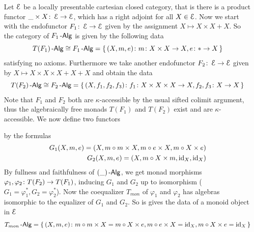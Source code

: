 \documentclass[a4paper,11pt,oneside,openany]{scrbook}
\begin{document}
\begin{exmp}
	Let $\operatorname{\mathcal{E}}$ be a locally presentable cartesian closed category, that is there is a product functor $\_ \times X \colon \operatorname{\mathcal{E}} \to \operatorname{\mathcal{E}}$, which has a right adjoint for
	all $X \in \operatorname{\mathcal{E}}$. Now we start with the endofunctor $F_{1} \colon \operatorname{\mathcal{E}} \to \operatorname{\mathcal{E}}$ given by the assignment $X \mapsto X \times X + X$. So the category of
	$F_{1}\operatorname{-\mathsf{Alg}}$ is given by the following data
	\begin{equation*}
		T(F_{1})\operatorname{-\mathsf{Alg}} \cong F_{1}\operatorname{-\mathsf{Alg}} = \left\lbrace\,(X,m,e)\colon m\colon X \times X \to X,e \colon \ast \to X  \,\right\rbrace
	\end{equation*}
	satisfying no axioms. Furthermore we take another endofunctor $F_{2} \colon \operatorname{\mathcal{E}} \to \operatorname{\mathcal{E}}$ given by $X \mapsto X \times X \times X + X + X$ and obtain the data
	\begin{equation*}
		T(F_{2})\operatorname{-\mathsf{Alg}} \cong F_{2}\operatorname{-\mathsf{Alg}} = \left\lbrace\,(X,f_{1},f_{2},f_{3})\colon f_{1}\colon X \times X \times X \to X, f_{2},f_{3} \colon X \to X \,\right\rbrace
	\end{equation*}
	Note that $F_{1}$ and $F_{2}$ both are $\kappa$-accessible by the usual sifted colimit argument, thus the algebraically free monads $T(F_{1})$ and
	$T(F_{2})$ exist and are $\kappa$-accessible. We now define two functors
	\begin{center}
	\end{center}
	by the formulas
	\begin{align*}
		G_{1}(X,m,e) = (X, m \circ m \times X, m \circ e \times X, m \circ X \times e) \\
		G_{2}(X,m,e) = (X, m \circ X \times m, \operatorname{id}_{X}, \operatorname{id}_{X})
	\end{align*}
	By fullness and faithfulness of $(\_)\operatorname{-\mathsf{Alg}}$, we get monad morphisms $\varphi_{1},\varphi_{2} \colon T(F_{2}) \to T(F_{1})$, inducing $G_{1}$ and $G_{2}$ up to
	isomorphism ($G_{1} = \varphi_{1}^{\ast},G_{2} = \varphi_{2}^{\ast}$). Now the coequalizer $T_{mon}$ of $\varphi_{1}$ and $\varphi_{2}$ has algebras
	isomorphic to the equalizer of $G_{1}$ and $G_{2}$. So is gives the data of a monoid object in $\operatorname{\mathcal{E}}$
	\begin{equation*}
		T_{mon}\operatorname{-\mathsf{Alg}} = \left\lbrace\,(X,m,e)\colon m \circ m \times X = m \circ X \times e, m \circ e \times X = \operatorname{id}_{X}, m \circ X \times e = \operatorname{id}_{X} \,\right\rbrace
	\end{equation*}
\end{exmp}
\end{document}
